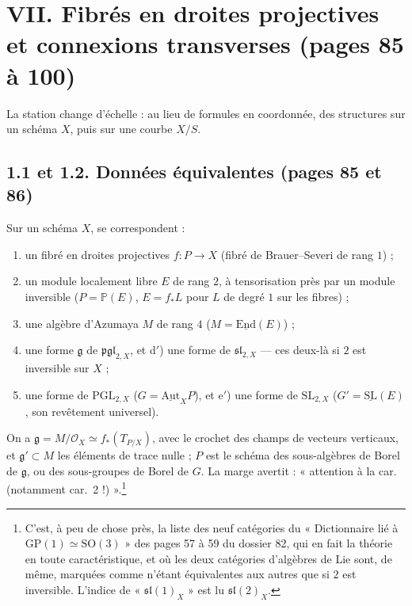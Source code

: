 \documentclass[11pt,a4paper]{article}
\begin{document}
\section*{VII. Fibrés en droites projectives et connexions transverses (pages 85 à 100)}

La station change d'échelle : au lieu de formules en coordonnée, des
structures sur un schéma $X$, puis sur une courbe $X/S$.

\subsection*{1.1 et 1.2. Données équivalentes (pages 85 et 86)}

Sur un schéma $X$, se correspondent :
\begin{enumerate}
  \item[a)] un fibré en droites projectives $f : P \to X$ (fibré de
  Brauer--Severi de rang $1$) ;
  \item[b)] un module localement libre $E$ de rang $2$, à tensorisation près
  par un module inversible ($P = \mathbb{P}(E)$, $E = f_*L$ pour $L$ de degré $1$
  sur les fibres) ;
  \item[c)] une algèbre d'Azumaya $M$ de rang $4$ ($M = \underline{\mathrm{End}}(E)$) ;
  \item[d)] une forme $\mathfrak{g}$ de $\mathfrak{pgl}_{2,X}$, et d$'$) une forme de
  $\mathfrak{sl}_{2,X}$ — ces deux-là si $2$ est inversible sur $X$ ;
  \item[e)] une forme de $\mathrm{PGL}_{2,X}$ ($G = \underline{\mathrm{Aut}}_X P$), et
  e$'$) une forme de $\mathrm{SL}_{2,X}$ ($G' = \underline{\mathrm{SL}}(E)$, son
  revêtement universel).
\end{enumerate}
On a $\mathfrak{g} = M/\mathcal{O}_X \simeq f_*(T_{P/X})$, avec le crochet des
champs de vecteurs verticaux, et $\mathfrak{g}' \subset M$ les éléments de trace
nulle ; $P$ est le schéma des sous-algèbres de Borel de $\mathfrak{g}$, ou des
sous-groupes de Borel de $G$. La marge avertit : « attention à la car.
(notamment car.~2 !) ».\footnote{C'est, à peu de chose près, la liste des
neuf catégories du « Dictionnaire lié à $\mathrm{GP}(1) \simeq \mathrm{SO}(3)$ »
des pages 57 à 59 du dossier 82, qui en fait la théorie en toute
caractéristique, et où les deux catégories d'algèbres de Lie sont, de même,
marquées comme n'étant équivalentes aux autres que si $2$ est inversible.
L'indice de « $\mathfrak{sl}(1)_X$ » est lu $\mathfrak{sl}(2)_X$.}
\end{document}
